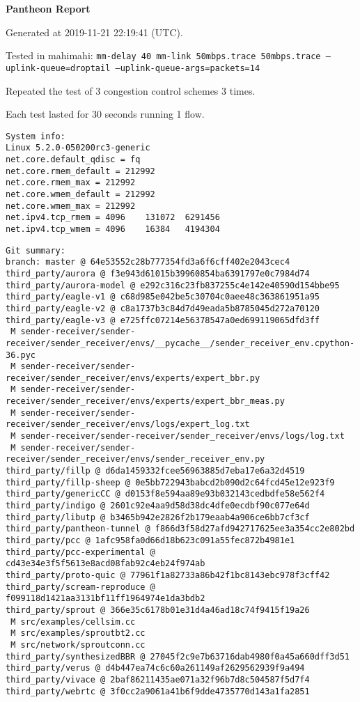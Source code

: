 \documentclass{article}
\begin{document}
\centerline{\textbf{\large{Pantheon Report}}}
\vspace{20pt}

Generated at 2019-11-21 22:19:41 (UTC).

Tested in mahimahi: \texttt{mm-delay 40 mm-link 50mbps.trace 50mbps.trace --uplink-queue=droptail --uplink-queue-args=packets=14}

Repeated the test of 3 congestion control schemes 3 times.

Each test lasted for 30 seconds running 1 flow.

\begin{verbatim}
System info:
Linux 5.2.0-050200rc3-generic
net.core.default_qdisc = fq
net.core.rmem_default = 212992
net.core.rmem_max = 212992
net.core.wmem_default = 212992
net.core.wmem_max = 212992
net.ipv4.tcp_rmem = 4096	131072	6291456
net.ipv4.tcp_wmem = 4096	16384	4194304
\end{verbatim}

\begin{verbatim}
Git summary:
branch: master @ 64e53552c28b777354fd3a6f6cff402e2043cec4
third_party/aurora @ f3e943d61015b39960854ba6391797e0c7984d74
third_party/aurora-model @ e292c316c23fb837255c4e142e40590d154bbe95
third_party/eagle-v1 @ c68d985e042be5c30704c0aee48c363861951a95
third_party/eagle-v2 @ c8a1737b3c84d7d49eada5b8785045d272a70120
third_party/eagle-v3 @ e725ffc07214e56378547a0ed699119065dfd3ff
 M sender-receiver/sender-receiver/sender_receiver/envs/__pycache__/sender_receiver_env.cpython-36.pyc
 M sender-receiver/sender-receiver/sender_receiver/envs/experts/expert_bbr.py
 M sender-receiver/sender-receiver/sender_receiver/envs/experts/expert_bbr_meas.py
 M sender-receiver/sender-receiver/sender_receiver/envs/logs/expert_log.txt
 M sender-receiver/sender-receiver/sender_receiver/envs/logs/log.txt
 M sender-receiver/sender-receiver/sender_receiver/envs/sender_receiver_env.py
third_party/fillp @ d6da1459332fcee56963885d7eba17e6a32d4519
third_party/fillp-sheep @ 0e5bb722943babcd2b090d2c64fcd45e12e923f9
third_party/genericCC @ d0153f8e594aa89e93b032143cedbdfe58e562f4
third_party/indigo @ 2601c92e4aa9d58d38dc4dfe0ecdbf90c077e64d
third_party/libutp @ b3465b942e2826f2b179eaab4a906ce6bb7cf3cf
third_party/pantheon-tunnel @ f866d3f58d27afd942717625ee3a354cc2e802bd
third_party/pcc @ 1afc958fa0d66d18b623c091a55fec872b4981e1
third_party/pcc-experimental @ cd43e34e3f5f5613e8acd08fab92c4eb24f974ab
third_party/proto-quic @ 77961f1a82733a86b42f1bc8143ebc978f3cff42
third_party/scream-reproduce @ f099118d1421aa3131bf11ff1964974e1da3bdb2
third_party/sprout @ 366e35c6178b01e31d4a46ad18c74f9415f19a26
 M src/examples/cellsim.cc
 M src/examples/sproutbt2.cc
 M src/network/sproutconn.cc
third_party/synthesizedBBR @ 27045f2c9e7b63716dab4980f0a45a660dff3d51
third_party/verus @ d4b447ea74c6c60a261149af2629562939f9a494
third_party/vivace @ 2baf86211435ae071a32f96b7d8c504587f5d7f4
third_party/webrtc @ 3f0cc2a9061a41b6f9dde4735770d143a1fa2851
\end{verbatim}
\end{document}
